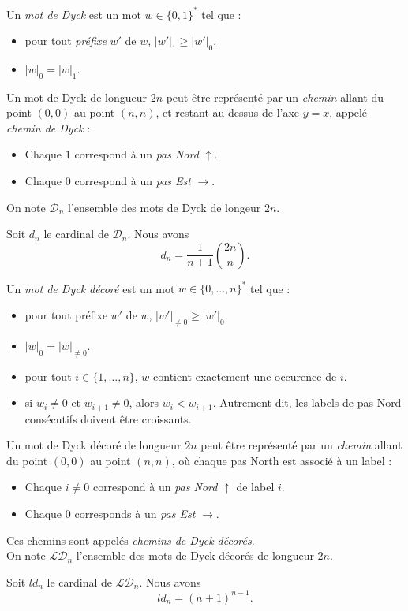 \begin{definition}
    Un \emph{mot de Dyck} est un mot $w \in \{0,1\}^*$ tel que :
    \begin{itemize}
        \item pour tout \emph{préfixe} $w'$ de $w$,
            $|w'|_1 \geqslant |w'|_0$.
        \item $|w|_0 = |w|_1$.
    \end{itemize}
\end{definition}

Un mot de Dyck de longueur $2n$ peut être représenté par un \emph{chemin}
allant du point $(0,0)$ au point $(n,n)$, et restant au dessus de l'axe
$y = x$, appelé \emph{chemin de Dyck} :
\begin{itemize}
    \item Chaque $1$ correspond à un \emph{pas Nord}
    $\uparrow$. 
    \item Chaque $0$ correspond à un \emph{pas Est}
    $\rightarrow$.
\end{itemize}

On note $\mathcal{D}_n$ l'ensemble des mots de Dyck de longeur $2n$.

\begin{theorem}[André, 1887]
    Soit $d_n$ le cardinal de $\mathcal{D}_n$.
    Nous avons $$d_n = \frac{1}{n + 1} \binom {2n}{n}.$$
\end{theorem}

\begin{definition}
    Un \emph{mot de Dyck décoré} est un mot $w \in 
    \{0, \ldots, n\}^*$ tel que :
    \begin{itemize}
        \item pour tout préfixe $w'$ de $w$,
            $|w'|_{\neq 0} \geqslant |w'|_0$.
        \item $|w|_0 = |w|_{\neq 0}$.
        \item pour tout $i \in \{1, \ldots, n\}$, $w$ contient
            exactement une occurence de $i$.
        \item si $w_i \neq 0$ et $w_{i+1} \neq 0$,
            alors $w_i < w_{i+1}$. Autrement dit, les labels de pas Nord
            consécutifs doivent être croissants.
    \end{itemize}
\end{definition}

Un mot de Dyck décoré de longueur $2n$ peut être représenté par un 
\emph{chemin} allant du point $(0,0)$ au point $(n,n)$, où chaque pas
North est associé à un label :
\begin{itemize}
    \item Chaque $i \neq 0$ correspond à un \emph{pas Nord} $\uparrow$
    de label $i$.
    \item Chaque $0$ corresponds à un \emph{pas Est} $\rightarrow$.
\end{itemize}

Ces chemins sont appelés \emph{chemins de Dyck décorés}.\\
On note $\mathcal{LD}_n$ l'ensemble des mots de Dyck décorés de longueur
$2n$.

\begin{theorem}
    Soit $ld_n$ le cardinal de $\mathcal{LD}_n$.
    Nous avons $$ld_n = (n + 1)^{n - 1}.$$
\end{theorem}